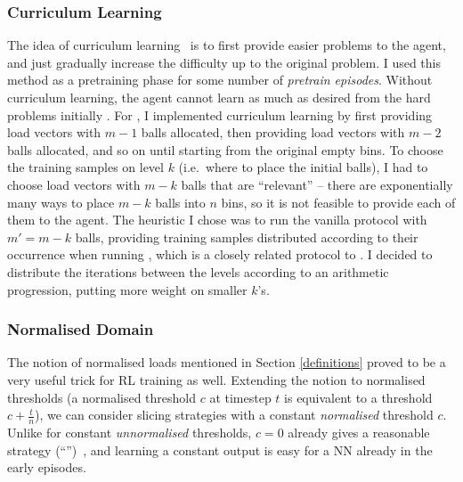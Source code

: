 \subsubsection{Curriculum Learning}


The idea of curriculum learning~\cite{bengio2009curriculumoriginal} is to first provide easier problems to the agent, and just gradually increase the difficulty up to the original problem. I used this method as a pretraining phase for some number of \textit{pretrain episodes}. Without curriculum learning, the agent cannot learn as much as desired from the hard problems initially . For \TwoThinning, I implemented curriculum learning by first providing load vectors with $m-1$ balls allocated, then providing load vectors with $m-2$ balls allocated, and so on until starting from the original empty bins. To choose the training samples on level $k$ (i.e.\ where to place the initial balls), I had to choose load vectors with $m-k$ balls that are ``relevant'' -- there are exponentially many ways to place $m-k$ balls into $n$ bins, so it is not feasible to provide each of them to the agent. The heuristic I chose was to run the vanilla \OneChoice protocol with $m'=m-k$ balls, providing training samples distributed according to their occurrence when running \OneChoice, which is a closely related protocol to \TwoThinning. I decided to distribute the iterations between the levels according to an arithmetic progression, putting more weight on smaller $k$'s.



\subsubsection{Normalised Domain} \label{normalised-domain}

The notion of normalised loads mentioned in Section \ref{definitions} proved to be a very useful trick for RL training as well. Extending the notion to normalised thresholds (a normalised threshold $c$ at timestep $t$ is equivalent to a threshold $c+\frac{t}{n}$), we can consider slicing strategies with a constant \textit{normalised} threshold $c$. Unlike for constant \textit{unnormalised} thresholds, $c=0$ already gives a reasonable strategy (``\MeanThinning'')~\cite{los2022cachingpackingthinningtwinning}, and learning a constant output is easy for a NN already in the early episodes.


